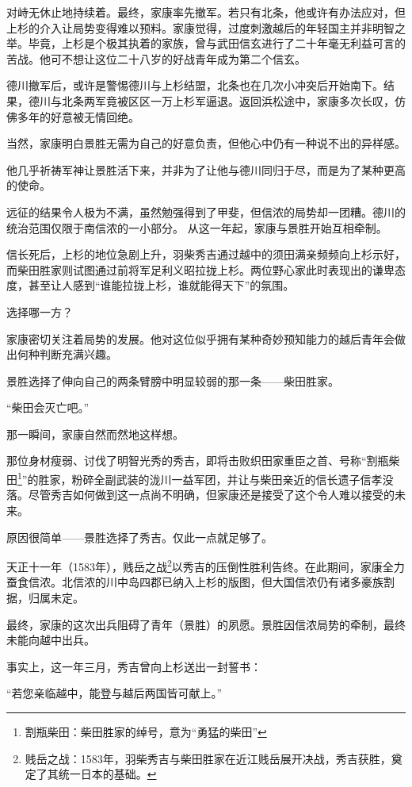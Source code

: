 \documentclass[
]{article}
\begin{document}
对峙无休止地持续着。最终，家康率先撤军。若只有北条，他或许有办法应对，但上杉的介入让局势变得难以预料。家康觉得，过度刺激越后的年轻国主并非明智之举。毕竟，上杉是个极其执着的家族，曾与武田信玄进行了二十年毫无利益可言的苦战。他可不想让这位二十八岁的好战青年成为第二个信玄。

德川撤军后，或许是警惕德川与上杉结盟，北条也在几次小冲突后开始南下。结果，德川与北条两军竟被区区一万上杉军逼退。返回浜松途中，家康多次长叹，仿佛多年的好意被无情回绝。

当然，家康明白景胜无需为自己的好意负责，但他心中仍有一种说不出的异样感。

他几乎祈祷军神让景胜活下来，并非为了让他与德川同归于尽，而是为了某种更高的使命。

远征的结果令人极为不满，虽然勉强得到了甲斐，但信浓的局势却一团糟。德川的统治范围仅限于南信浓的一小部分。
从这一年起，家康与景胜开始互相牵制。

信长死后，上杉的地位急剧上升，羽柴秀吉通过越中的须田满亲频频向上杉示好，而柴田胜家则试图通过前将军足利义昭拉拢上杉。两位野心家此时表现出的谦卑态度，甚至让人感到``谁能拉拢上杉，谁就能得天下''的氛围。

选择哪一方？

家康密切关注着局势的发展。他对这位似乎拥有某种奇妙预知能力的越后青年会做出何种判断充满兴趣。

景胜选择了伸向自己的两条臂膀中明显较弱的那一条------柴田胜家。

``柴田会灭亡吧。''

那一瞬间，家康自然而然地这样想。

那位身材瘦弱、讨伐了明智光秀的秀吉，即将击败织田家重臣之首、号称``割瓶柴田\footnote{割瓶柴田：柴田胜家的绰号，意为``勇猛的柴田''}''的胜家，粉碎全副武装的泷川一益军团，并让与柴田亲近的信长遗子信孝没落。尽管秀吉如何做到这一点尚不明确，但家康还是接受了这个令人难以接受的未来。

原因很简单------景胜选择了秀吉。仅此一点就足够了。

天正十一年（1583年），贱岳之战\footnote{贱岳之战：1583年，羽柴秀吉与柴田胜家在近江贱岳展开决战，秀吉获胜，奠定了其统一日本的基础。}以秀吉的压倒性胜利告终。在此期间，家康全力蚕食信浓。北信浓的川中岛四郡已纳入上杉的版图，但大国信浓仍有诸多豪族割据，归属未定。

最终，家康的这次出兵阻碍了青年（景胜）的夙愿。景胜因信浓局势的牵制，最终未能向越中出兵。

事实上，这一年三月，秀吉曾向上杉送出一封誓书：

``若您亲临越中，能登与越后两国皆可献上。''
\end{document}
